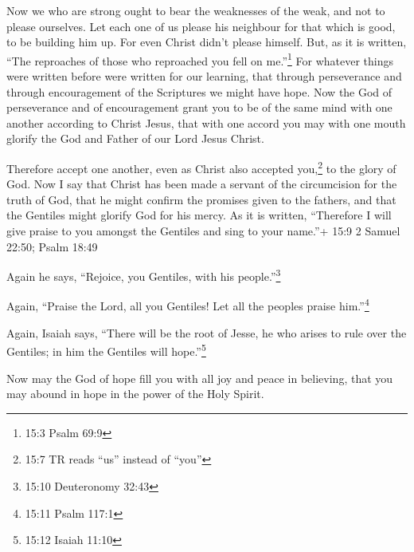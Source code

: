  Now we who are strong ought to bear the weaknesses of the
weak, and not to please ourselves.  Let each one of us
please his neighbour for that which is good, to be building him up.
 For even Christ didn't please himself. But, as it is
written, ``The reproaches of those who reproached you fell on
me.''\footnote{15:3 Psalm 69:9}  For whatever things were
written before were written for our learning, that through perseverance
and through encouragement of the Scriptures we might have hope.
 Now the God of perseverance and of encouragement grant you
to be of the same mind with one another according to Christ Jesus,
 that with one accord you may with one mouth glorify the God
and Father of our Lord Jesus Christ.

 Therefore accept one another, even as Christ also accepted
you,\footnote{15:7 TR reads ``us'' instead of ``you''} to the glory of
God.  Now I say that Christ has been made a servant of the
circumcision for the truth of God, that he might confirm the promises
given to the fathers,  and that the Gentiles might glorify
God for his mercy. As it is written, ``Therefore I will give praise to
you amongst the Gentiles and sing to your name.''+ 15:9 2 Samuel 22:50;
Psalm 18:49

 Again he says, ``Rejoice, you Gentiles, with his
people.''\footnote{15:10 Deuteronomy 32:43}

 Again, ``Praise the Lord, all you Gentiles! Let all the
peoples praise him.''\footnote{15:11 Psalm 117:1}

 Again, Isaiah says, ``There will be the root of Jesse, he
who arises to rule over the Gentiles; in him the Gentiles will
hope.''\footnote{15:12 Isaiah 11:10}

 Now may the God of hope fill you with all joy and peace in
believing, that you may abound in hope in the power of the Holy Spirit.

